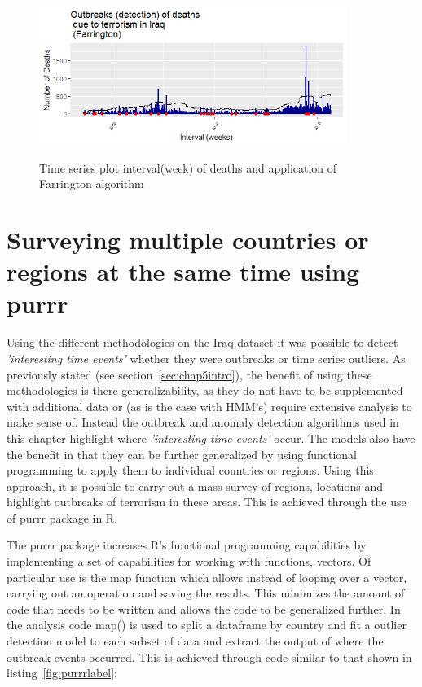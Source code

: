 \begin{figure}[t]
\includegraphics[width=10cm]{Peters_experiment_markdown_files/figure-latex/Rplot02_Farrington_detected_Outbreaks.png}
\label{fig:tseriesFarrington}
\centering
\caption{Time series plot interval(week) of deaths and application of Farrington algorithm}
\end{figure}

\section{Surveying multiple countries or regions at the same time using purrr}

Using the different methodologies on the Iraq dataset it was possible to detect \textit{'interesting time events'} whether they were outbreaks or time series outliers. As previously stated (see section~\ref{sec:chap5intro}), the benefit of using these methodologies is there generalizability, as they do not have to be supplemented with additional data or (as is the case with HMM's) require extensive analysis to make sense of. Instead the outbreak and anomaly detection algorithms used in this chapter highlight where \textit{'interesting time events'} occur. The models also have the benefit in that they can be further generalized by using functional programming to apply them to individual countries or regions. Using this approach, it is possible to carry out a mass survey of regions, locations and highlight outbreaks of terrorism in these areas. This is achieved through the use of purrr package \citep{purrrWickham2016} in R. 

The purrr package \citep{wickham2016r} increases R's functional programming capabilities by implementing a set of capabilities for working with functions, vectors. Of particular use is the map function which allows instead of looping over a vector, carrying out an operation and saving the results. This minimizes the amount of code that needs to be written and allows the code to be generalized further. In the analysis code map() is used to split a dataframe by country and fit a outlier detection model to each subset of data and extract the output of where the outbreak events occurred. This is achieved through code similar to that shown in listing~\ref{fig:purrrlabel}: 

